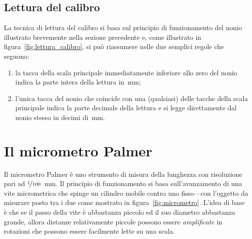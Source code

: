 \subsection{Lettura del calibro}

La tecnica di lettura del calibro si basa sul principio di funzionamento del
nonio illustrato brevemente nella sezione precedente e, come illustrato in
figura~\ref{fig:lettura_calibro}, si può riassumere nelle due semplici regole
che seguono:
\begin{enumerate}
\item la tacca della scala principale immediatamente inferiore allo zero del
  nonio indica la parte intera della lettura in~mm;
\item l'unica tacca del nonio che coincide con una (qualsiasi) delle tacche
  della scala principale indica la parte decimale della lettura e si
  legge direttamente dal nonio stesso in decimi di~mm.
\end{enumerate}


\begin{figure}[!htbp]
\end{figure}


\section{Il micrometro Palmer}

Il micrometro Palmer è uno strumento di misura della lunghezza con
risoluzione pari ad $\nicefrac{1}{100}$~mm. Il principio di funzionamento si
basa sull'avanzamento di una vite micrometrica che spinge un cilindro mobile
contro uno fisso---con l'oggetto da misurare posto tra i due come mostrato
in figura~\ref{fig:micrometro}. L'idea di base è che se il passo della vite
è abbastanza piccolo ed il suo diametro abbastanza grande, allora distanze
relativamente piccole possono essere \emph{amplificate} in rotazioni che possono
essere facilmente lette su una scala.

\medskip

